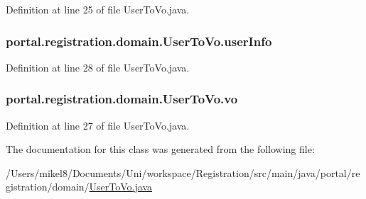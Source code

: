 Definition at line 25 of file UserToVo.java.

\hypertarget{classportal_1_1registration_1_1domain_1_1UserToVo_a9584de18496e8a8c2105ece810c4452a}{
\subsubsection[{userInfo}]{ {\bf portal.registration.domain.UserToVo.userInfo}}}
\label{classportal_1_1registration_1_1domain_1_1UserToVo_a9584de18496e8a8c2105ece810c4452a}


Definition at line 28 of file UserToVo.java.

\hypertarget{classportal_1_1registration_1_1domain_1_1UserToVo_ad229709d89c14b6517530399c1c5c1e8}{
\subsubsection[{vo}]{ {\bf portal.registration.domain.UserToVo.vo}}}
\label{classportal_1_1registration_1_1domain_1_1UserToVo_ad229709d89c14b6517530399c1c5c1e8}


Definition at line 27 of file UserToVo.java.



The documentation for this class was generated from the following file:\begin{DoxyCompactItemize}
\item 
/Users/mikel8/Documents/Uni/workspace/Registration/src/main/java/portal/registration/domain/\hyperlink{UserToVo_8java}{UserToVo.java}\end{DoxyCompactItemize}
